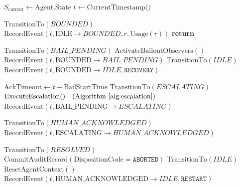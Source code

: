 \begin{algorithm}[H]
\caption{Bailout Protocol Transition Evaluator}
\label{alg:transition_eval}
\begin{algorithmic}
\State $S_{\text{current}} \gets \text{Agent.State}$
\State $t \gets \text{CurrentTimestamp()}$

            \State $\text{TransitionTo}(BOUNDED)$
            \State $\text{RecordEvent}(t, \text{IDLE}\rightarrow BOUNDED, r, \text{Usage}(r))$
            \State \textbf{return}
        \EndIf
    \EndFor

        \State $\text{TransitionTo}(BAIL\_PENDING)$
        \State $\text{ActivateBailoutObservers}()$
        \State $\text{RecordEvent}(t, \text{BOUNDED}\rightarrow BAIL\_PENDING)$
        \State $\text{TransitionTo}(IDLE)$
        \State $\text{RecordEvent}(t, \text{BOUNDED}\rightarrow IDLE, \texttt{RECOVERY})$
    \EndIf

    \State $\text{AckTimeout} \gets t - \text{BailStartTime}$
        \State $\text{TransitionTo}(ESCALATING)$
        \State $\text{ExecuteEscalation()} \quad \text{(Algorithm~\ref{alg:escalation})}$
        \State $\text{RecordEvent}(t, \text{BAIL\_PENDING}\rightarrow ESCALATING)$
    \EndIf

        \State $\text{TransitionTo}(HUMAN\_ACKNOWLEDGED)$
        \State $\text{RecordEvent}(t, \text{ESCALATING}\rightarrow HUMAN\_ACKNOWLEDGED)$
    \EndIf

        \State $\text{TransitionTo}(RESOLVED)$
        \State $\text{CommitAuditRecord}(\text{DispositionCode} = \texttt{ABORTED})$
        \State $\text{TransitionTo}(IDLE)$
        \State $\text{ResetAgentContext}()$
        \State $\text{RecordEvent}(t, \text{HUMAN\_ACKNOWLEDGED}\rightarrow IDLE, \texttt{RESTART})$
    \EndIf
\EndIf
\end{algorithmic}
\end{algorithm}

